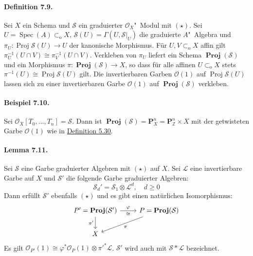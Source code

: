 \documentclass[11pt,b5paper,openany]{memoir}
\begin{document}
\paragraph{Definition 7.9.}\label{7.9} Sei $X$ ein Schema und $\mathcal{S}$ ein graduierter $\mathcal{O}_X$"~Modul mit $(\star)$. Sei $U=\operatorname{Spec}(A)\subset_\text{o}X$, $\mathcal{S}(U)=\Gamma(U,\mathcal{S}|_U)$ die graduierte $A$"~Algebra und $\pi_U:\operatorname{Proj}\mathcal{S}(U)\to U$ der kanonische Morphismus. Für $U,V\subset_\text{o}X$ affin gilt $\pi_U^{-1}(U\cap V)\cong\pi_V^{-1}(U\cap V)$. Verkleben von $\pi_U$ liefert ein Schema $\operatorname{\mathbf{Proj}}(\mathcal{S})$ und ein Morphismus $\pi:\operatorname{\mathbf{Proj}}(\mathcal{S})\to X$, so dass für alle affinen $U\subset_\text{o}X$ stets $\pi^{-1}(U)\cong\operatorname{Proj}\mathcal{S}(U)$ gilt. Die invertierbaren Garben $\mathcal{O}(1)$ auf $\operatorname{Proj}\mathcal{S}(U)$ lassen sich zu einer invertierbaren Garbe $\mathcal{O}(1)$ auf $\operatorname{\mathbf{Proj}}(\mathcal{S})$ verkleben.

\paragraph{Beispiel 7.10.}\label{7.10} Sei $\mathcal{O}_X[T_0,\ldots,T_n]=\mathcal{S}$. Dann ist $\operatorname{\mathbf{Proj}}(\mathcal{S})=\mathbf{P}_X^n=\mathbf{P}_\mathbb{Z}^n\times X$ mit der getwisteten Garbe $\mathcal{O}(1)$ wie in \hyperref[5.30]{Definition 5.30}.

\paragraph{Lemma 7.11.}\label{7.11} Sei $\mathcal{S}$ eine Garbe graduierter Algebren mit $(\star)$ auf $X$. Sei $\mathcal{L}$ eine invertierbare Garbe auf $X$ und $\mathcal{S}'$ die folgende Garbe graduierter Algebren:
\[\mathcal{S}_d' =\mathcal{S}_1\otimes\mathcal{L}^d,\quad d\geq 0 \]
Dann erfüllt $\mathcal{S}'$ ebenfalls $(\star)$ und es gibt einen natürlichen Isomorphismus:
\[\begin{tikzcd}
P'=\operatorname{\mathbf{Proj}}(\mathcal{S}')\ar[d, "\pi'"']\ar[r, "\varphi", "\cong"'] & P=\operatorname{\mathbf{Proj}}(\mathcal{S})\ar[dl, "\pi"]\\
X&
\end{tikzcd} \]
Es gilt $\mathcal{O}_{P'}(1)\cong \varphi^\ast\mathcal{O}_P(1)\otimes\pi'^\ast\mathcal{L}$. $\mathcal{S}'$ wird auch mit $\mathcal{S}\ast\mathcal{L}$ bezeichnet.
\end{document}
